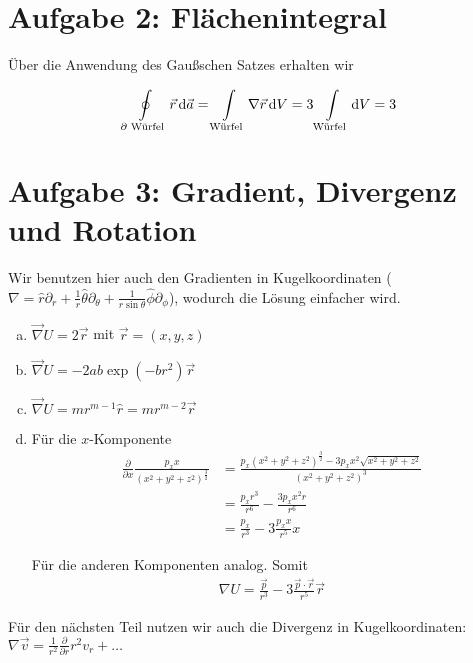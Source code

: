\documentclass[a4paper,german,12pt,smallheadings]{scrartcl}
\begin{document}
\section*{Aufgabe 2: Flächenintegral}

Über die Anwendung des Gaußschen Satzes erhalten wir

\begin{equation*}
  \oint\limits_\text{$\partial$ Würfel} \vec{r} \dif \vec{a} = \int\limits_\text{Würfel} \nabla \vec{r} \dif V = 3 \int\limits_\text{Würfel} \dif V = 3
\end{equation*}

\section*{Aufgabe 3: Gradient, Divergenz und Rotation}

Wir benutzen hier auch den Gradienten in Kugelkoordinaten ($\nabla = \hat{r}
\partial_r + \frac{1}{r} \hat{\theta} \partial_\theta + \frac{1}{r \sin \theta}
\hat{\phi} \partial_\phi$), wodurch die Lösung einfacher wird.

\begin{enumerate}[a)]
  \item $\vec{\nabla} U = 2 \vec{r}$ mit $\vec{r} = (x,y,z)$
  \item $\vec{\nabla} U = -2ab \exp(-br^2) \vec{r}$
  \item $\vec{\nabla} U = mr^{m-1} \hat{r} = mr^{m-2} \vec{r}$
  \item
    Für die $x$-Komponente
    \begin{align*}
      \frac{\partial}{\partial x} \frac{p_x x}{(x^2+y^2+z^2)^\frac{3}{2}}
      &= \frac{p_x(x^2+y^2+z^2)^\frac{3}{2} - 3p_xx^2\sqrt{x^2+y^2+z^2}}{(x^2+y^2+z^2)^3} \\
      &= \frac{p_x r^3}{r^6} - \frac{3p_x x^2 r}{r^6} \\
      &= \frac{p_x}{r^3} - 3 \frac{p_x x}{r^5} x
    \end{align*}

    Für die anderen Komponenten analog. Somit
    \begin{align*}
      \nabla U = \frac{\vec{p}}{r^3} - 3 \frac{\vec{p} \cdot \vec{r}}{r^5} \vec{r}
    \end{align*}
\end{enumerate}


Für den nächsten Teil nutzen wir auch die Divergenz in Kugelkoordinaten:
$\nabla \vec{v} = \frac{1}{r^2} \frac{\partial}{\partial r} r^2 v_r + \dots$
\end{document}
